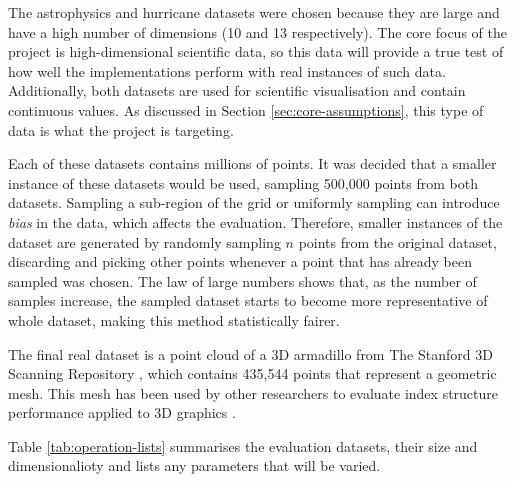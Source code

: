 The astrophysics and hurricane datasets were chosen because they are large and have a high number of dimensions (10 and 13 respectively). The core focus of the project is high-dimensional scientific data, so this data will provide a true test of how well the implementations perform with real instances of such data. Additionally, both datasets are used for scientific visualisation and contain continuous values. As discussed in Section \ref{sec:core-assumptions}, this type of data is what the project is targeting.

Each of these datasets contains millions of points. It was decided that a smaller instance of these datasets would be used, sampling 500,000 points from both datasets. Sampling a sub-region of the grid or uniformly sampling can introduce \textit{bias} in the data, which affects the evaluation. Therefore, smaller instances of the dataset are generated by randomly sampling $n$ points from the original dataset, discarding and picking other points whenever a point that has already been sampled was chosen. The law of large numbers \cite{large-sample-theory} shows that, as the number of samples increase, the sampled dataset starts to become more representative of whole dataset, making this method statistically fairer.

The final real dataset is a point cloud of a 3D armadillo from The Stanford 3D Scanning Repository \cite{armadillo-mesh}, which contains 435,544 points that represent a geometric mesh. This mesh has been used by other researchers to evaluate index structure performance applied to 3D graphics \cite{kd-tree-gpu, accelerating-kdtree-nn}.

Table \ref{tab:operation-lists} summarises the evaluation datasets, their size and dimensionalioty and lists any parameters that will be varied.

